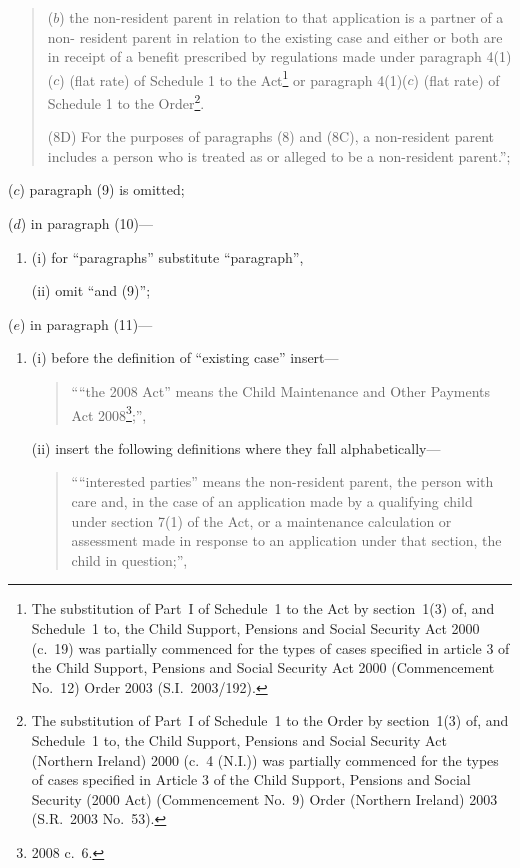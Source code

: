 \documentclass[12pt,a4paper]{article}
\begin{document}
\begin{enumerate}
\begin{quotation}
\begin{enumerate}
($b$) the non-resident parent in relation to that application is a partner of a non-%
resident parent in relation to the existing case and either or both are in 
receipt of a benefit prescribed by regulations made under paragraph 4(1)($c$)
(flat rate) of Schedule 1 to the Act\footnote{The substitution of Part~I of Schedule~1 to the Act by section~1(3) of, and Schedule~1 to, the Child Support, Pensions and Social Security Act 2000 (c.~19) was partially commenced for the types of cases specified in article 3 of the Child Support, Pensions and Social Security Act 2000 (Commencement No.~12) Order 2003 (S.I.~2003/192).} or paragraph 4(1)($c$) (flat rate) of
Schedule 1 to the Order\footnote{The substitution of Part~I of Schedule~1 to the Order by section~1(3) of, and Schedule~1 to, the Child Support, Pensions and Social Security Act (Northern Ireland) 2000 (c.~4 (N.I.)) was partially commenced for the types of cases specified in Article 3 of the Child Support, Pensions and Social Security (2000 Act) (Commencement No.~9) Order (Northern Ireland) 2003 (S.R.~2003 No.~53).}.
\end{enumerate}

(8D) For the purposes of paragraphs (8) and (8C), a non-resident parent includes a 
person who is treated as or alleged to be a non-resident parent.'';
\end{quotation}

($c$) paragraph (9) is omitted;

($d$) in paragraph (10)---
\begin{enumerate}\item[]
(i) for ``paragraphs'' substitute ``paragraph'',

(ii) omit ``and (9)'';
\end{enumerate}

($e$) in paragraph (11)---
\begin{enumerate}\item[]
(i) before the definition of ``existing case'' insert---
\begin{quotation}
````the 2008 Act'' means the Child Maintenance and Other Payments Act 2008\footnote{2008 c.~6.};'',
\end{quotation}

(ii) insert the following definitions where they fall alphabetically---
\begin{quotation}
````interested parties'' means the non-resident parent, the person with care and, in
the case of an application made by a qualifying child under section 7(1) of the
Act, or a maintenance calculation or assessment made in response to an
application under that section, the child in question;'',


\end{quotation}
\end{enumerate}
\end{enumerate}
\end{document}
